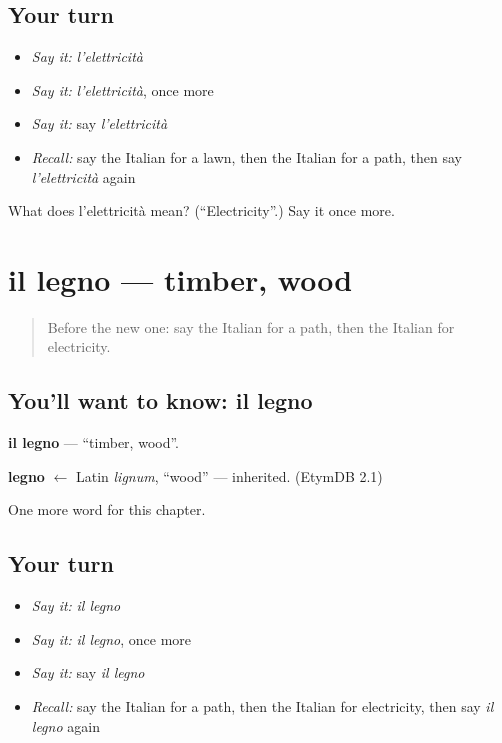 \subsection*{Your turn}
\begin{itemize}
\raggedright
  \item \emph{Say it:} \emph{l'elettricità}
  \item \emph{Say it:} \emph{l'elettricità}, once more
  \item \emph{Say it:} say \emph{l'elettricità}
  \item \emph{Recall:} say the Italian for a lawn, then the Italian for a path, then say \emph{l'elettricità} again
\end{itemize}

\begin{tcolorbox}[breakable,colback=teal!4,colframe=teal!35!black,title={Before you move on}]
What does l'elettricità mean? (\textquotedblleft{}Electricity\textquotedblright{}.) Say it once more.
\end{tcolorbox}
\section[il legno]{il legno — timber, wood}

\label{lesson:IT-C201-legno}



\begin{quote}
Before the new one: say the Italian for a path, then the Italian for electricity.
\end{quote}

\subsection*{You'll want to know: il legno}
\textbf{il legno} — \textquotedblleft{}timber, wood\textquotedblright{}.

\begin{cousinweb}
\textbf{legno} $\leftarrow$ Latin \emph{lignum}, \textquotedblleft{}wood\textquotedblright{} — inherited. (EtymDB 2.1)
\end{cousinweb}

\begin{grammarlens}[title={What you've built}]
One more word for this chapter.
\end{grammarlens}

\subsection*{Your turn}
\begin{itemize}
\raggedright
  \item \emph{Say it:} \emph{il legno}
  \item \emph{Say it:} \emph{il legno}, once more
  \item \emph{Say it:} say \emph{il legno}
  \item \emph{Recall:} say the Italian for a path, then the Italian for electricity, then say \emph{il legno} again
\end{itemize}

